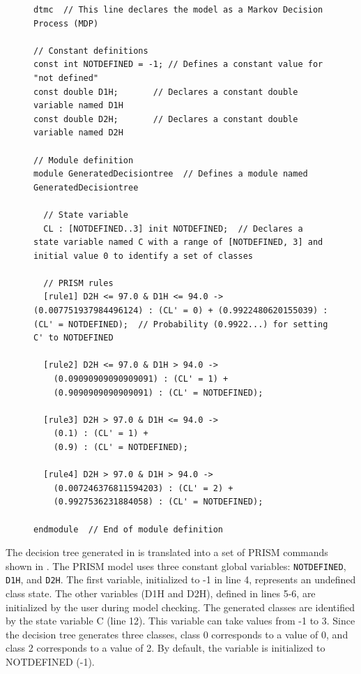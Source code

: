 \begin{figure}[!htb]            
\begin{minipage}{16.5cm}
\begin{lstlisting}[style=framed,%customc,
	caption=Mapping to Probabilistic Commands for Model under Temperature Variations,
 	label=learnedprismmodel]	
dtmc  // This line declares the model as a Markov Decision Process (MDP)

// Constant definitions
const int NOTDEFINED = -1; // Defines a constant value for "not defined"
const double D1H;       // Declares a constant double variable named D1H
const double D2H;       // Declares a constant double variable named D2H

// Module definition
module GeneratedDecisiontree  // Defines a module named GeneratedDecisiontree

  // State variable
  CL : [NOTDEFINED..3] init NOTDEFINED;  // Declares a state variable named C with a range of [NOTDEFINED, 3] and initial value 0 to identify a set of classes

  // PRISM rules
  [rule1] D2H <= 97.0 & D1H <= 94.0 ->  (0.007751937984496124) : (CL' = 0) + (0.9922480620155039) : (CL' = NOTDEFINED);  // Probability (0.9922...) for setting C' to NOTDEFINED

  [rule2] D2H <= 97.0 & D1H > 94.0 ->  
    (0.09090909090909091) : (CL' = 1) +  
    (0.9090909090909091) : (CL' = NOTDEFINED);

  [rule3] D2H > 97.0 & D1H <= 94.0 ->  
    (0.1) : (CL' = 1) +  
    (0.9) : (CL' = NOTDEFINED);

  [rule4] D2H > 97.0 & D1H > 94.0 ->  
    (0.007246376811594203) : (CL' = 2) +  
    (0.9927536231884058) : (CL' = NOTDEFINED);

endmodule  // End of module definition

\end{lstlisting}
 \end{minipage}  
\end{figure}

The decision tree generated in  is translated into a set of PRISM commands shown in . The PRISM model uses three constant global variables: \texttt{NOTDEFINED}, \texttt{D1H}, and \texttt{D2H}. The first variable, initialized to -1 in line 4, represents an undefined class state. The other variables (D1H and D2H), defined in lines 5-6, are initialized by the user during model checking. The generated classes are identified by the state variable C (line 12). This variable can take values from -1 to 3. Since the decision tree generates three classes, class 0 corresponds to a value of 0, and class 2 corresponds to a value of 2. By default, the variable is initialized to NOTDEFINED (-1).

